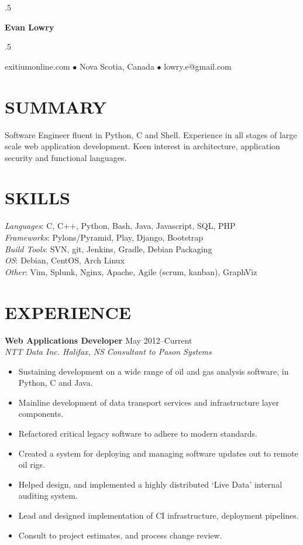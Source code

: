 \documentclass[line,margin]{res}
\begin{document}
\moveleft.5\hoffset\centerline{\LARGE\bf Evan Lowry}
\moveleft.5\hoffset\centerline{exitiumonline.com   {$\bullet$}   Nova Scotia, Canada {$\bullet$}   lowry.e@gmail.com}
 
\begin{resume}
\section{SUMMARY}
Software Engineer fluent in Python, C and Shell. Experience in all stages of
large scale web application development. Keen interest in architecture, 
application security and functional languages.

\section{SKILLS}
\textit{Languages}: C, C++, Python, Bash, Java, Javascript, SQL, PHP \\
\textit{Frameworks}: Pylons/Pyramid, Play, Django, Bootstrap \\
\textit{Build Tools}: SVN, git, Jenkins, Gradle, Debian Packaging \\
\textit{OS}: Debian, CentOS, Arch Linux \\
\textit{Other}: Vim, Splunk, Nginx, Apache, Agile (scrum, kanban), GraphViz

\section{EXPERIENCE}
\textbf{Web Applications Developer} \hfill May 2012--Current \\
\textit{NTT Data Inc. Halifax, NS} \hfill \textit{Consultant to Pason Systems}
\begin{itemize} \itemsep-2pt
    \item Sustaining development on a wide range of oil and gas analysis software, in Python, C and Java.
    \item Mainline development of data transport services and infrastructure layer components.
    \item Refactored critical legacy software to adhere to modern standards.
    \item Created a system for deploying and managing software updates out to remote oil rigs.
    \item Helped design, and implemented a highly distributed `Live Data' internal auditing system.
    \item Lead and designed implementation of CI infrastructure, deployment pipelines.
    \item Consult to project estimates, and process change review.
\end{itemize}


\end{resume}
\end{document}
